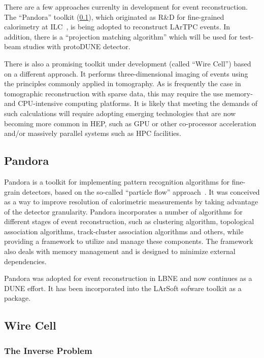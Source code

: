There are a few approaches currenlty in development for event reconstruction. The ``Pandora'' toolkit (\ref{sec:pandora}), which
originated as R\&D for fine-grained calorimetry at ILC~\cite{pandora}, is being adopted to reconstruct LArTPC events.
In addition, there is a ``projection matching algorithm'' which will be used for test-beam studies with protoDUNE detector.

There is also a promising toolkit under development (called ``Wire Cell'') based on a different approach.
It performs three-dimensional imaging of events using the principles commonly applied in tomography.
As is frequently the case in tomographic reconstruction with sparse data, this may require the use memory- and CPU-intensive computing platforms.
It is likely that meeting the demands of such calculations will require adopting emerging technologies that are now becoming more common in
HEP, such as GPU or other co-processor acceleration and/or massively parallel systems such as HPC facilities.

\subsection{Pandora}
\label{sec:pandora}
 Pandora is a toolkit for implementing pattern recognition algorithms for fine-grain detectors, based on the so-called ``particle flow'' approach~\cite{pandora}.
It was conceived as a way to improve resolution of calorimetric measurements by taking advantage of the detector granularity. Pandora incorporates a
number of algorithms for different stages of event reconstruction, such as clustering algorithm, topological association algorithms, track-cluster association
algorithms and others, while providing a framework to utilize and manage these components. The framework also deals with memory management
and is designed to minimize external dependencies.

Pandora was adopted for event reconstruction in LBNE and now continues as a DUNE effort. It has been incorporated into the LArSoft sofware toolkit
as a package.



\subsection{Wire Cell}
\label{sec:wirecell}
\subsubsection{The Inverse Problem}

